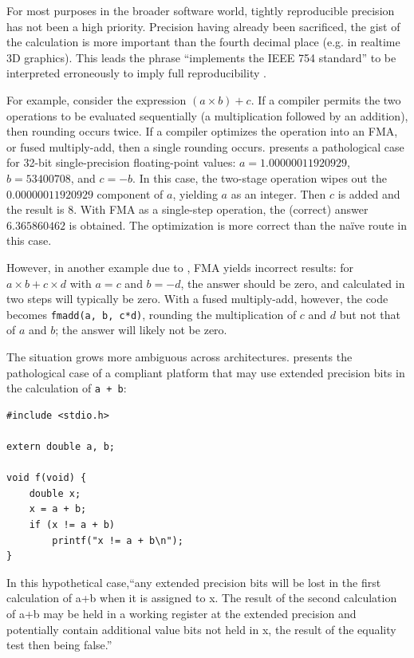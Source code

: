 \documentclass[twoside]{article}
\begin{document}
For most purposes in the broader software world, tightly reproducible precision has not been a high priority.  Precision having already been sacrificed, the gist of the calculation is more important than the fourth decimal place (e.g. in realtime 3D graphics).  This leads the phrase “implements the IEEE 754 standard” to be interpreted erroneously to imply full reproducibility \citep{Figueroa2000}.

For example, consider the expression $(a \times b) + c$.  If a compiler permits the two operations to be evaluated sequentially (a multiplication followed by an addition), then rounding occurs twice.  If a compiler optimizes the operation into an FMA, or fused multiply-add, then a single rounding occurs.  \citeauthor{Peters2021} presents a pathological case for 32-bit single-precision floating-point values:  $a = 1.00000011920929$, $b = 53400708$, and $c = -b$.  In this case, the two-stage operation wipes out the $0.00000011920929$ component of $a$, yielding $a$ as an integer.  Then $c$ is added and the result is $8$.  With FMA as a single-step operation, the (correct) answer $6.365860462$ is obtained.  The optimization is more correct than the naïve route in this case.

However, in another example due to \citeauthor{Dawson2013}, FMA yields incorrect results:  for $a \times b + c \times d$ with $a = c$ and $b = -d$, the answer should be zero, and calculated in two steps will typically be zero.  With a fused multiply-add, however, the code becomes \texttt{fmadd(a, b, c*d)}, rounding the multiplication of $c$ and $d$ but not that of $a$ and $b$; the answer will likely not be zero.

The situation grows more ambiguous across architectures.  \citet[p.~346]{Jones2008} presents the pathological case of a compliant platform that may use extended precision bits in the calculation of \texttt{a + b}:

\lstset{language=C}
\begin{lstlisting}
#include <stdio.h>

extern double a, b;

void f(void) {
    double x;
    x = a + b;
    if (x != a + b)
        printf("x != a + b\n");
}
\end{lstlisting}

\noindent
In this hypothetical case,“any extended precision bits will be lost in the first calculation of a+b when it is assigned to x. The result of the second calculation of a+b may be held in a working register at the extended precision and potentially contain additional value bits not held in x, the result of the equality test then being false.”
\end{document}

